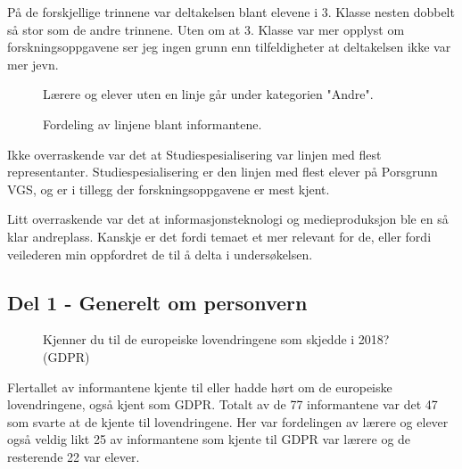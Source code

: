 På de forskjellige trinnene var deltakelsen blant elevene i 3. Klasse nesten dobbelt så stor som de andre trinnene. Uten om at 3. Klasse var mer opplyst om forskningsoppgavene ser jeg ingen grunn enn tilfeldigheter at deltakelsen ikke var mer jevn.

\begin{figure}[H]
    \centering
    Lærere og elever uten en linje går under kategorien "Andre".
    \caption{Fordeling av linjene blant informantene.}
\end{figure}
Ikke overraskende var det at Studiespesialisering var linjen med flest representanter. Studiespesialisering er den linjen med flest elever på Porsgrunn VGS, og er i tillegg der forskningsoppgavene er mest kjent. 

Litt overraskende var det at informasjonsteknologi og medieproduksjon ble en så klar andreplass. Kanskje er det fordi temaet et mer relevant for de, eller fordi veilederen min oppfordret de til å delta i undersøkelsen.

\subsection{Del 1 - Generelt om personvern}
\begin{figure}[H]
    \centering
    \caption{Kjenner du til de europeiske lovendringene som skjedde i 2018? (GDPR)}
\end{figure}
Flertallet av informantene kjente til eller hadde hørt om de europeiske lovendringene, også kjent som GDPR. Totalt av de 77 informantene var det 47 som svarte at de kjente til lovendringene. Her var fordelingen av lærere og elever også veldig likt 25 av informantene som kjente til GDPR var lærere og de resterende 22 var elever. 

